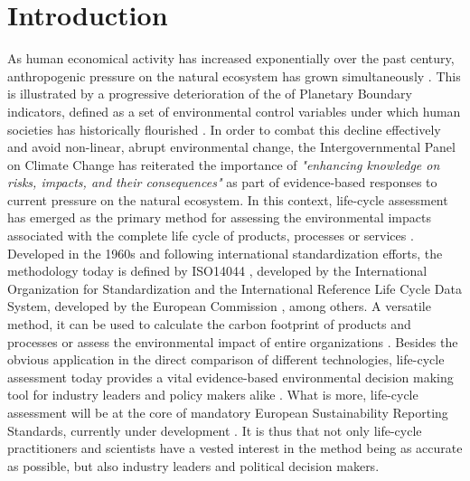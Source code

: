 \documentclass{article}
\begin{document}
\section{Introduction}
\label{sec:introduction}
    
    As human economical activity has increased exponentially over the past century, anthropogenic pressure on the natural ecosystem has grown simultaneously \cite{steffen_anthropocene_2007}. This is illustrated by a progressive deterioration of the of Planetary Boundary indicators, defined as a set of environmental control variables under which human societies has historically flourished \cite{rockstrom_planetary_2009}\cite{steffen_planetary_2015}. In order to combat this decline effectively and avoid non-linear, abrupt environmental change, the Intergovernmental Panel on Climate Change has reiterated the importance of 
    \textit{"enhancing knowledge on risks, impacts, and their consequences"} \cite{rama_climate_2022} as part of evidence-based responses to current pressure on the natural ecosystem. In this context, life-cycle assessment has emerged as the primary method for assessing the environmental impacts associated with the complete life cycle of products, processes or services \cite{hauschild_life_2018}. Developed in the 1960s and following international standardization efforts, the methodology today is defined by ISO14044 \cite{noauthor_iso_2006}, developed by the International Organization for Standardization and the International Reference Life Cycle Data System, developed by the European Commission \cite{european_commission_joint_research_centre_institute_for_environment_and_sustainability_ildc_2010}, among others. A versatile method, it can be used to calculate the carbon footprint of products and processes \cite{finkbeiner_carbon_2016} or assess the environmental impact of entire organizations \cite{finkbeiner_life_2016}. Besides the obvious application in the direct comparison of different technologies, life-cycle assessment today provides a vital evidence-based environmental decision making tool for industry leaders and policy makers alike \cite{tillman_significance_2000}\cite{seidel_application_2016}\cite{dong_environmental_2018}. What is more, life-cycle assessment will be at the core of mandatory European Sustainability Reporting Standards, currently under development \cite{noauthor_public_2022}. It is thus that not only life-cycle practitioners and scientists have a vested interest in the method being as accurate as possible, but also industry leaders and political decision makers. 
    
\end{document}

